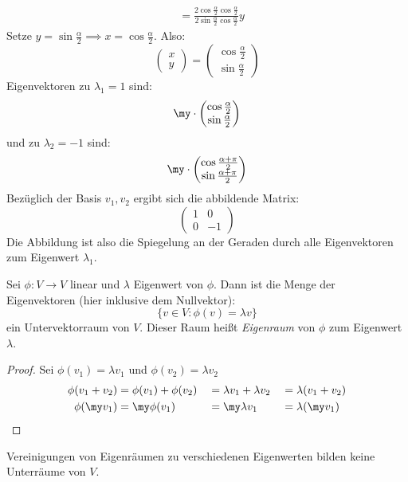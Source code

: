 \documentclass[a4paper, 10pt]{scrbook}
\begin{document}
\begin{ex}
\begin{itemize}
\begin{align*}
&=\frac {2\cos\frac\alpha2\cos\frac\alpha2}{2\sin\frac\alpha2\cos\frac\alpha2}y
\end{align*}
Setze $y=\sin\frac\alpha2\implies x=\cos\frac\alpha2$.
Also:
\[
\begin{pmatrix}x\\y\end{pmatrix}=\begin{pmatrix}\cos\frac \alpha2\\\sin\frac\alpha2\end{pmatrix}
\]
Eigenvektoren zu $\lambda_1=1$ sind:
\[
\my\cdot \begin{pmatrix}\cos\frac\alpha2\\ \sin\frac\alpha2\end{pmatrix}
\]
und zu $\lambda_2=-1$ sind:
\[
\my\cdot \begin{pmatrix}\cos\frac{\alpha+\pi}2 \\ \sin\frac{\alpha +\pi}2\end{pmatrix}
\]
Bezüglich der Basis $v_1,v_2$ ergibt sich die abbildende Matrix:
\[
\begin{pmatrix}1&0\\0&-1\end{pmatrix}
\]
Die Abbildung ist also die Spiegelung an der Geraden durch alle Eigenvektoren zum Eigenwert $\lambda_1$.
\end{itemize}
\end{ex}

\begin{prop}
\label{prop:10.5}
Sei $\phi:V\to V$ linear und $\lambda$ Eigenwert von $\phi$.
Dann ist die Menge der Eigenvektoren (hier inklusive dem Nullvektor):
\[
\{v\in V:\phi(v)=\lambda v\}
\]
ein Untervektorraum von $V$.
Dieser Raum heißt \emph{Eigenraum} von $\phi$ zum Eigenwert $\lambda$.

\begin{proof}
Sei $\phi(v_1)=\lambda v_1$ und $\phi(v_2)=\lambda v_2$
\begin{alignat*}{3}
	\phi(v_1+v_2)&=\phi(v_1)+\phi(v_2)&&=\lambda v_1+\lambda v_2 &&= \lambda(v_1+v_2)\\
 \phi(\my v_1)&=\my\phi(v_1)&&=\my\lambda v_1&&=\lambda (\my v_1)
\end{alignat*}
\end{proof}
\begin{note}
Vereinigungen von Eigenräumen zu verschiedenen Eigenwerten bilden keine Unterräume von $V$.
\end{note}
\end{prop}
\end{document}
